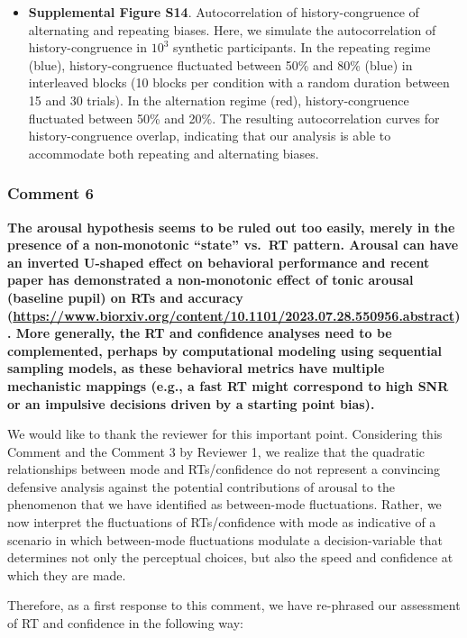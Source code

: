 \documentclass[
]{article}
\providecommand{\tightlist}{%
  \setlength{\itemsep}{0pt}\setlength{\parskip}{0pt}}
\begin{document}
\begin{itemize}
\tightlist
\item
  \textbf{Supplemental Figure S14}. Autocorrelation of
  history-congruence of alternating and repeating biases. Here, we
  simulate the autocorrelation of history-congruence in
  \ensuremath{10^{3}} synthetic participants. In the repeating regime
  (blue), history-congruence fluctuated between 50\% and 80\% (blue) in
  interleaved blocks (10 blocks per condition with a random duration
  between 15 and 30 trials). In the alternation regime (red),
  history-congruence fluctuated between 50\% and 20\%. The resulting
  autocorrelation curves for history-congruence overlap, indicating that
  our analysis is able to accommodate both repeating and alternating
  biases.
\end{itemize}

\hypertarget{comment-6-1}{%
\subsubsection{Comment 6}\label{comment-6-1}}

\textbf{The arousal hypothesis seems to be ruled out too easily, merely
in the presence of a non-monotonic ``state'' vs.~RT pattern. Arousal can
have an inverted U-shaped effect on behavioral performance and recent
paper has demonstrated a non-monotonic effect of tonic arousal (baseline
pupil) on RTs and accuracy
(\url{https://www.biorxiv.org/content/10.1101/2023.07.28.550956.abstract}).
More generally, the RT and confidence analyses need to be complemented,
perhaps by computational modeling using sequential sampling models, as
these behavioral metrics have multiple mechanistic mappings (e.g., a
fast RT might correspond to high SNR or an impulsive decisions driven by
a starting point bias).}

We would like to thank the reviewer for this important point.
Considering this Comment and the Comment 3 by Reviewer 1, we realize
that the quadratic relationships between mode and RTs/confidence do not
represent a convincing defensive analysis against the potential
contributions of arousal to the phenomenon that we have identified as
between-mode fluctuations. Rather, we now interpret the fluctuations of
RTs/confidence with mode as indicative of a scenario in which
between-mode fluctuations modulate a decision-variable that determines
not only the perceptual choices, but also the speed and confidence at
which they are made.

Therefore, as a first response to this comment, we have re-phrased our
assessment of RT and confidence in the following way:
\end{document}
